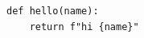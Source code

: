 \documentclass{article}
\begin{document}
\begin{verbatim}
def hello(name):
    return f"hi {name}"
\end{verbatim}
\end{document}
